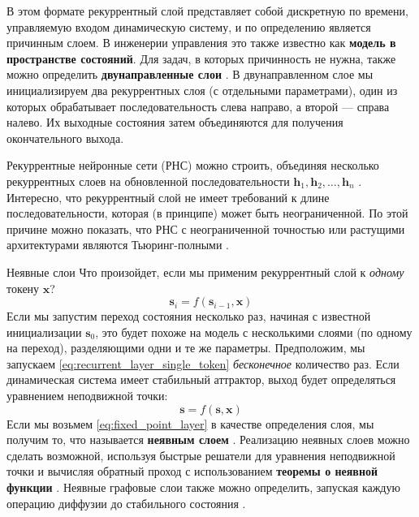%
В этом формате рекуррентный слой представляет собой дискретную по времени, управляемую входом динамическую систему, и по определению является причинным слоем. В инженерии управления это также известно как \textbf{модель в пространстве состояний}. Для задач, в которых причинность не нужна, также можно определить \textbf{двунаправленные слои} \cite{schuster1997bidirectional}. В двунаправленном слое мы инициализируем два рекуррентных слоя (с отдельными параметрами), один из которых обрабатывает последовательность слева направо, а второй — справа налево. Их выходные состояния затем объединяются для получения окончательного выхода. 

Рекуррентные нейронные сети (РНС) можно строить, объединяя несколько рекуррентных слоев на обновленной последовательности $\mathbf{h}_1, \mathbf{h}_2, \ldots, \mathbf{h}_n$ \cite{pascanu2013construct}. Интересно, что рекуррентный слой не имеет требований к длине последовательности, которая (в принципе) может быть неограниченной. По этой причине можно показать, что РНС с неограниченной точностью или растущими архитектурами являются Тьюринг-полными \cite{chung2021turing}.

\begin{supportbox}{Неявные слои}
%
Что произойдет, если мы применим рекуррентный слой к \textit{одному} токену $\mathbf{x}$?
%
\begin{equation}
\mathbf{s}_i = f(\mathbf{s}_{i-1}, \mathbf{x})
\label{eq:recurrent_layer_single_token}
\end{equation}
%
Если мы запустим переход состояния несколько раз, начиная с известной инициализации $\mathbf{s}_0$, это будет похоже на модель с несколькими слоями (по одному на переход), разделяющими одни и те же параметры. Предположим, мы запускаем \eqref{eq:recurrent_layer_single_token} \textit{бесконечное} количество раз. Если динамическая система имеет стабильный аттрактор, выход будет определяться уравнением неподвижной точки:
%
\begin{equation}
\mathbf{s} = f(\mathbf{s}, \mathbf{x})
\label{eq:fixed_point_layer}
\end{equation}
%
Если мы возьмем \eqref{eq:fixed_point_layer} в качестве определения слоя, мы получим то, что называется \textbf{неявным слоем} \cite{bai2019deep}. Реализацию неявных слоев можно сделать возможной, используя быстрые решатели для уравнения неподвижной точки и вычисляя обратный проход с использованием \textbf{теоремы о неявной функции} \cite{bai2019deep}. Неявные графовые слои также можно определить, запуская каждую операцию диффузии до стабильного состояния \cite{gori2005new,scarselli2008graph}. 
%
\end{supportbox}

